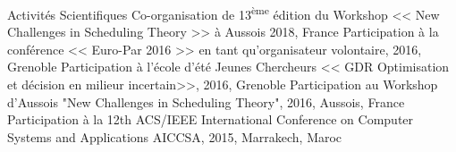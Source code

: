 \begin{rubric}{Activités Scientifiques}
    \entry*[]	Co-organisation de 13\textsuperscript{ème}  édition du Workshop << New Challenges in Scheduling Theory >> à Aussois 2018, France 
\entry*[]	Participation à la conférence << Euro-Par 2016 >> en tant qu'organisateur volontaire, 2016, Grenoble 
\entry*[]	Participation à l'école d'été Jeunes Chercheurs << GDR Optimisation et décision en milieur incertain>>, 2016, Grenoble 	
\entry*[]	Participation au Workshop d'Aussois "New Challenges in Scheduling Theory", 2016, Aussois, France	
\entry*[]	Participation à la 12th ACS/IEEE International Conference on Computer Systems and Applications AICCSA, 2015, Marrakech, Maroc 	
\end{rubric}
